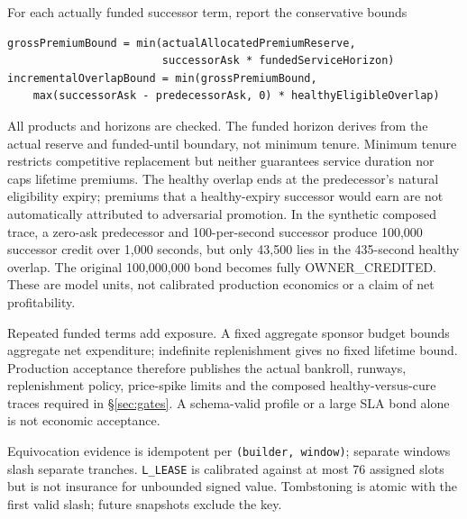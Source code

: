 \documentclass[a4paper,11pt]{article}
\newcommand{\code}[1]{\nolinkurl{#1}}
\begin{document}
For each actually funded successor term, report the conservative bounds
\begin{verbatim}
grossPremiumBound = min(actualAllocatedPremiumReserve,
                        successorAsk * fundedServiceHorizon)
incrementalOverlapBound = min(grossPremiumBound,
    max(successorAsk - predecessorAsk, 0) * healthyEligibleOverlap)
\end{verbatim}
All products and horizons are checked.  The funded horizon derives from the
actual reserve and funded-until boundary, not minimum tenure.  Minimum tenure
restricts competitive replacement but neither guarantees service duration nor
caps lifetime premiums.  The healthy overlap ends at the predecessor's natural
eligibility expiry; premiums that a healthy-expiry successor would earn are
not automatically attributed to adversarial promotion.  In the synthetic
composed trace, a zero-ask predecessor and 100-per-second successor produce
100,000 successor credit over 1,000 seconds, but only 43,500 lies in the
435-second healthy overlap.  The original 100,000,000 bond becomes fully
OWNER\_CREDITED.  These are model units, not calibrated production economics or
a claim of net profitability.

Repeated funded terms add exposure.  A fixed aggregate sponsor budget bounds
aggregate net expenditure; indefinite replenishment gives no fixed lifetime
bound.  Production acceptance therefore publishes the actual bankroll,
runways, replenishment policy, price-spike limits and the composed
healthy-versus-cure traces required in \S\ref{sec:gates}.  A schema-valid
profile or a large SLA bond alone is not economic acceptance.

Equivocation evidence is idempotent per \code{(builder, window)}; separate
windows slash separate tranches.  \code{L_LEASE} is calibrated against at most
76 assigned slots but is not insurance for unbounded signed value.  Tombstoning
is atomic with the first valid slash; future snapshots exclude the key.
\end{document}
